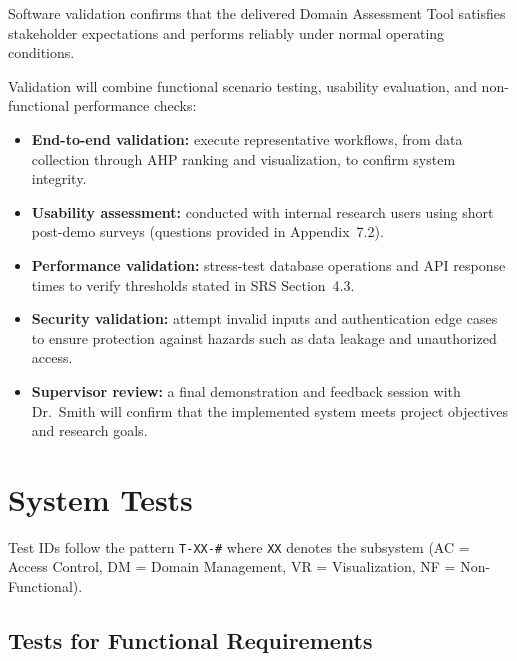 \documentclass[12pt, titlepage]{article}
\begin{document}

Software validation confirms that the delivered Domain Assessment Tool satisfies
stakeholder expectations and performs reliably under normal operating
conditions.

Validation will combine functional scenario testing, usability evaluation, and
non-functional performance checks:

\begin{itemize}
  \item \textbf{End-to-end validation:} execute representative workflows, from
  data collection through AHP ranking and visualization, to confirm system
  integrity.

  \item \textbf{Usability assessment:} conducted with internal research users
  using short post-demo surveys (questions provided in Appendix~7.2).

  \item \textbf{Performance validation:} stress-test database operations and API
  response times to verify thresholds stated in SRS Section~4.3.

  \item \textbf{Security validation:} attempt invalid inputs and authentication
  edge cases to ensure protection against hazards such as data leakage and
  unauthorized access.

  \item \textbf{Supervisor review:} a final demonstration and feedback session
  with Dr.~Smith will confirm that the implemented system meets project
  objectives and research goals.
\end{itemize}

\section{System Tests}
\label{sec:system-tests}
Test IDs follow the pattern \texttt{T-XX-\#} where \texttt{XX} denotes the
subsystem (AC = Access Control, DM = Domain Management, VR = Visualization,
NF = Non-Functional).

\subsection{Tests for Functional Requirements}
\label{subsec:functional-tests}
\end{document}
